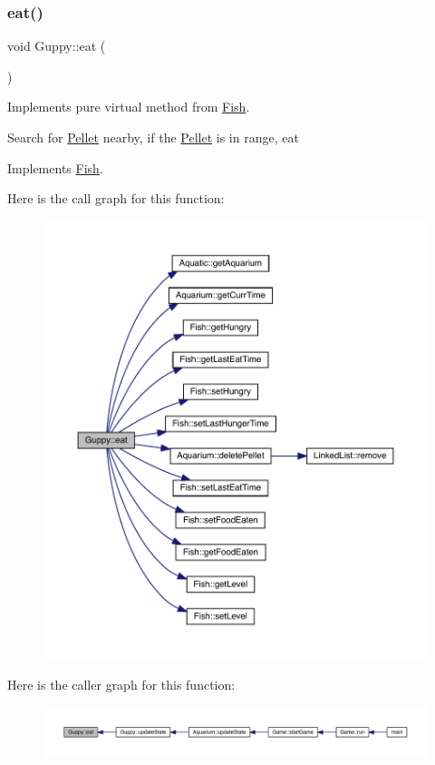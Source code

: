 \subsubsection{\texorpdfstring{eat()}{eat()}}
{\footnotesize\ttfamily void Guppy\+::eat (\begin{DoxyParamCaption}{ }\end{DoxyParamCaption})\hspace{0.3cm}{\ttfamily [virtual]}}



Implements pure virtual method from \mbox{\hyperlink{class_fish}{Fish}}. 

Search for \mbox{\hyperlink{class_pellet}{Pellet}} nearby, if the \mbox{\hyperlink{class_pellet}{Pellet}} is in range, eat 

Implements \mbox{\hyperlink{class_fish_af209980bd39b8de9b4bb38b7ad4edd04}{Fish}}.

Here is the call graph for this function\+:\nopagebreak
\begin{figure}[H]
\begin{center}
\leavevmode
\includegraphics[width=350pt]{class_guppy_afe934262a0988e4ad041f4ed3a1a7e02_cgraph}
\end{center}
\end{figure}
Here is the caller graph for this function\+:\nopagebreak
\begin{figure}[H]
\begin{center}
\leavevmode
\includegraphics[width=350pt]{class_guppy_afe934262a0988e4ad041f4ed3a1a7e02_icgraph}
\end{center}
\end{figure}
\mbox{\label{class_guppy_ae6002948d74b3741bed34a7311be4377}} 
